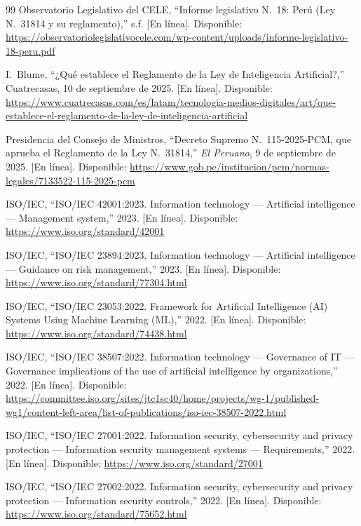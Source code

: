 \documentclass[12pt,a4paper]{article}
\begin{document}
\begin{thebibliography}{99}
Observatorio Legislativo del CELE, ``Informe legislativo N.\textdegree~18: Perú
(Ley N.\textdegree~31814 y su reglamento),'' s.f. [En línea]. Disponible:
\url{https://observatoriolegislativocele.com/wp-content/uploads/informe-legislativo-18-peru.pdf}

I.~Blume, ``¿Qué establece el Reglamento de la Ley de Inteligencia
Artificial?,'' Cuatrecasas, 10 de septiembre de 2025. [En línea]. Disponible:
\url{https://www.cuatrecasas.com/es/latam/tecnologia-medios-digitales/art/que-establece-el-reglamento-de-la-ley-de-inteligencia-artificial}

Presidencia del Consejo de Ministros, ``Decreto Supremo N.\textdegree~115-2025-PCM,
que aprueba el Reglamento de la Ley N.\textdegree~31814,'' \textit{El Peruano},
9 de septiembre de 2025. [En línea]. Disponible:
\url{https://www.gob.pe/institucion/pcm/normas-legales/7133522-115-2025-pcm}

ISO/IEC, ``ISO/IEC 42001:2023. Information technology --- Artificial
intelligence --- Management system,'' 2023. [En línea]. Disponible:
\url{https://www.iso.org/standard/42001}

ISO/IEC, ``ISO/IEC 23894:2023. Information technology --- Artificial
intelligence --- Guidance on risk management,'' 2023. [En línea]. Disponible:
\url{https://www.iso.org/standard/77304.html}

ISO/IEC, ``ISO/IEC 23053:2022. Framework for Artificial Intelligence (AI)
Systems Using Machine Learning (ML),'' 2022. [En línea]. Disponible:
\url{https://www.iso.org/standard/74438.html}

ISO/IEC, ``ISO/IEC 38507:2022. Information technology --- Governance of IT ---
Governance implications of the use of artificial intelligence by
organizations,'' 2022. [En línea]. Disponible:
\url{https://committee.iso.org/sites/jtc1sc40/home/projects/wg-1/published-wg1/content-left-area/list-of-publications/iso-iec-38507-2022.html}

ISO/IEC, ``ISO/IEC 27001:2022. Information security, cybersecurity and privacy
protection --- Information security management systems --- Requirements,''
2022. [En línea]. Disponible: \url{https://www.iso.org/standard/27001}

ISO/IEC, ``ISO/IEC 27002:2022. Information security, cybersecurity and privacy
protection --- Information security controls,'' 2022. [En línea]. Disponible:
\url{https://www.iso.org/standard/75652.html}


\end{thebibliography}
\end{document}
